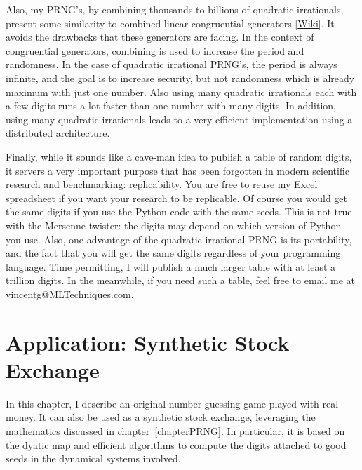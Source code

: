\documentclass[oneside,10pt]{book}
\begin{document}
Also, my PRNG's, by combining thousands to billions of quadratic irrationals, present some similarity to
 \textcolor{index}{combined linear congruential generators} [\href{https://en.wikipedia.org/wiki/Combined_linear_congruential_generator}{Wiki}]. It avoids the drawbacks that these generators are facing.  In the context of congruential generators, combining is used to increase the period and randomness. In the case of
 quadratic irrational PRNG's, the period is always infinite, and the goal is to increase security, but not randomness which is already maximum with just one number. Also using many quadratic irrationals each with a few digits runs a lot faster than one number with many digits. In addition, using many quadratic irrationals leads to a very efficient implementation using a
 distributed architecture.

Finally, while it sounds like a cave-man idea to publish a table of random digits, it servers a very important purpose that has been forgotten in modern scientific research and benchmarking: replicability. You are free to reuse my Excel spreadsheet if
 you want your research to be replicable. Of course you would get the same digits if you use the Python code with the same seeds. This is not true with the Mersenne twister: the digits may depend on which version of Python you use. Also, one advantage of the quadratic irrational PRNG is its portability, and the fact that you will get the same digits regardless of your programming language. Time permitting, I will publish a much larger table with at least a trillion digits.
 In the meanwhile, if you need such a table, feel free to email me at vincentg@MLTechniques.com.


\chapter{Application: Synthetic Stock Exchange}{}\label{pouti}

In this chapter, I describe an original number guessing game played with real money. It can also be used
 as a synthetic stock exchange, leveraging the mathematics discussed in chapter~\ref{chapterPRNG}.  In particular, it is based on the \textcolor{index}{dyatic map} and efficient algorithms to
compute the \textcolor{index}{digits} attached to
\textcolor{index}{good seeds} in the dynamical systems involved.
\end{document}
